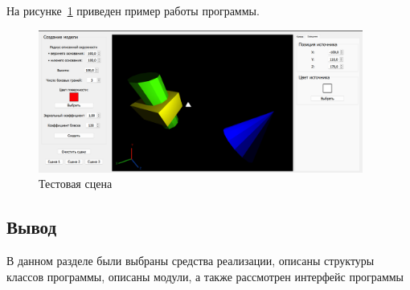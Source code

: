 \clearpage

На рисунке~\ref{fig:example_work} приведен пример работы программы.

\begin{figure}[h]
	\centering
	\includegraphics[width=0.95\textwidth]{img/examples/example-models.png}
	\caption{Тестовая сцена}
	\label{fig:example_work}
\end{figure}

\subsection*{Вывод}

В данном разделе были выбраны средства реализации, описаны структуры классов программы, описаны модули, а также рассмотрен интерфейс программы
